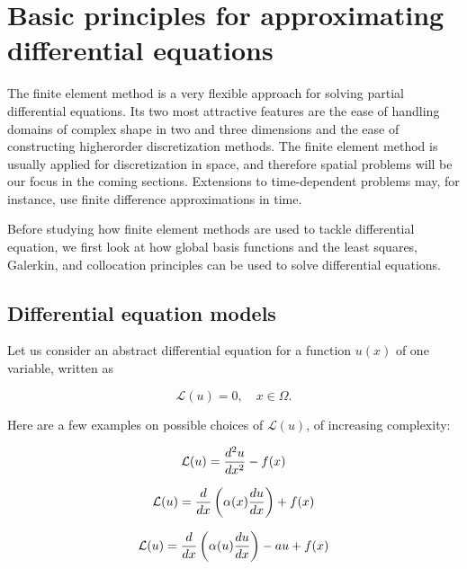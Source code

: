 \documentclass[../main.tex]{subfiles}
\begin{document}
\chapter{Basic principles for approximating differential equations}
	\label{chap:chap_11}
	
	\noindent The finite element method is a very flexible approach for solving partial differential equations. Its two most attractive features are the ease of handling domains of complex shape in two and three dimensions and the ease of constructing higherorder discretization methods. The finite element method is usually applied for discretization in space, and therefore spatial problems will be our focus in the coming sections. Extensions to time-dependent problems may, for instance, use finite difference approximations in time.
	
	Before studying how finite element methods are used to tackle differential equation, we first look at how global basis functions and the least squares, Galerkin, and collocation principles can be used to solve differential equations.

\section[Differential equation models]{Differential equation models}
\label{sec:sec_11_1}
	Let us consider an abstract differential equation for a function $u(x)$ of one variable, written as
	
	\begin{equation}
		\label{eqa117}		
		\mathcal{L}(u)=0, \quad x \in \Omega .
	\end{equation}
	
	Here are a few examples on possible choices of $\mathcal{L}(u)$, of increasing complexity:
	
	\begin{equation}
		\label{eqa118}
		\mathcal{L}(u)=\frac{d^{2} u}{d x^{2}}-f(x) \\
	\end{equation}
	
	\begin{equation}
		\label{eqa119}
		\mathcal{L}(u)=\frac{d}{d x}\left(\alpha(x) \frac{d u}{d x}\right)+f(x) \\
	\end{equation}
	
	\begin{equation}
		\label{eqa120}
		\mathcal{L}(u)=\frac{d}{d x}\left(\alpha(u) \frac{d u}{d x}\right)-a u+f(x) \\
	\end{equation}
	
\end{document}
